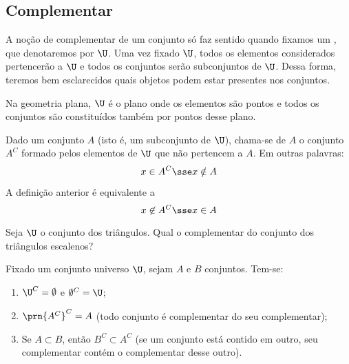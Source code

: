 \subsection{Complementar}
A noção de complementar de um conjunto só faz sentido quando fixamos um , que denotaremos por $\U$.
Uma vez fixado $\U$, todos os elementos considerados pertencerão a $\U$ e todos os conjuntos serão subconjuntos de $\U$.
Dessa forma, teremos bem esclarecidos quais objetos podem estar presentes nos conjuntos.

\begin{example}
Na geometria plana, $\U$ é o plano onde os elementos são pontos e todos os conjuntos são constituídos também por pontos desse plano.
\end{example}

\begin{definition}[Complementar]
\label{def:complementar}
Dado um conjunto $A$ (isto é, um subconjunto de $\U$), chama-se  de $A$ o conjunto $A^C$ formado pelos elementos de $\U$ que não pertencem a $A$.
Em outras palavras:
$$
x \in A^C \sse x \notin A
$$
\end{definition}

\begin{remark}
A definição anterior é equivalente a
$$
x \not \in A^C \sse x \in A
$$
\end{remark}

\begin{example}
Seja $\U$ o conjunto dos triângulos.
Qual o complementar do conjunto dos triângulos escalenos?
\end{example}

\begin{proposition}
\label{prop-complementar}
Fixado um conjunto universo $\U$, sejam $A$ e $B$ conjuntos.
Tem-se:
%
\begin{enumerate}
	\item $\U^C=\emptyset$ e $\emptyset^C = \U$;
	\item $\prn{A^C}^C=A$ (todo conjunto é complementar do seu complementar);
	\item Se $A \subset B$, então $B^C \subset A^C$ (se um conjunto está contido em outro, seu complementar contém o complementar desse outro). 
\end{enumerate}
\end{proposition}


